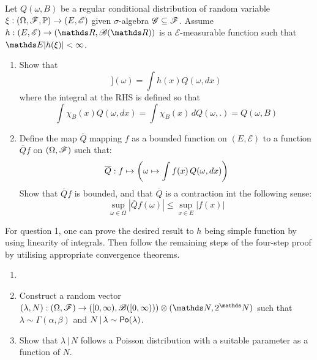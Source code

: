 \begin{unexaminable}
\begin{exercise}
Let $Q(\omega,B)$ be a regular conditional distribution of random variable $\xi: (\Omega,\mathcal{F},\mathbb{P}) \to (E,\mathcal{E})$ given $\sigma$-algebra $\mathcal{G}\subseteq\mathcal{F}$. Assume $h:(E,\mathcal{E}) \to (\R,\B(\R))$ is a $\mathcal{E}$-measurable function such that $\E|h(\xi)| < \infty$. 
\begin{enumerate}
    \item Show that
\begin{equation}
    [\E[h(\xi)\,|\,\G]](\omega) = \int h(x) Q(\omega, dx) 
\end{equation}
where the integral at the RHS is defined so that
\begin{equation}
    \int \chi_B(x) Q(\omega, dx) = \int \chi_B(x) \, dQ(\omega, .) =  Q(\omega,B)
\end{equation}
    \item Define the map $\overline{Q}$ mapping $f$ as a bounded function on $(E,\mathcal{E})$ to a function $\overline{Q}f$ on $(\Omega,\mathcal{F})$ such that:
    \begin{equation}
        \overline{Q}: f \mapsto \left( \omega \mapsto \int f(x) \, Q(\omega, dx) \right)
    \end{equation}
    Show that $\overline{Q}f$ is bounded, and that $\overline{Q}$ is a contraction int the following sense:
    \begin{equation}
        \sup_{\omega \in \Omega} |\overline{Q}f(\omega)| \leq \sup_{x \in E} |f(x)|
    \end{equation}
\end{enumerate}
\end{exercise}

\begin{hint}
For question 1, one can prove the desired result to $h$ being simple function by using linearity of integrals. Then follow the remaining steps of the four-step proof by utilising appropriate convergence theorems.
\end{hint}

\begin{exercise}
\begin{enumerate}
    \item[]
    \item Construct a random vector $(\lambda,N): (\Omega,\F) \to ([0,\infty), \B([0,\infty))) \otimes (\N, 2^\N)$ such that $\lambda \sim \Gamma(\alpha,\beta)$ and $N \,|\, \lambda \sim \mathsf{Po}(\lambda)$.
    \item Show that $\lambda \,|\, N$ follows a Poisson distribution with a suitable parameter as a function of $N$.
\end{enumerate}
\end{exercise}
\end{unexaminable}